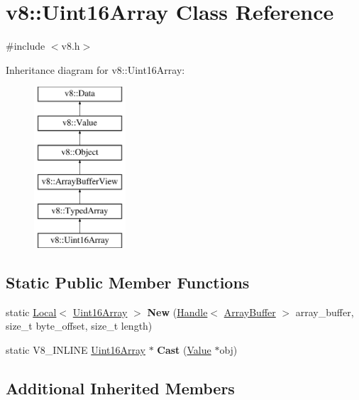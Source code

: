 \hypertarget{classv8_1_1Uint16Array}{}\section{v8\+:\+:Uint16\+Array Class Reference}
\label{classv8_1_1Uint16Array}


{\ttfamily \#include $<$v8.\+h$>$}

Inheritance diagram for v8\+:\+:Uint16\+Array\+:\begin{figure}[H]
\begin{center}
\leavevmode
\includegraphics[height=6.000000cm]{classv8_1_1Uint16Array}
\end{center}
\end{figure}
\subsection*{Static Public Member Functions}
\begin{DoxyCompactItemize}
\item 
\hypertarget{classv8_1_1Uint16Array_a61009e1e8ee6903da33cb95685910270}{}static \hyperlink{classv8_1_1Local}{Local}$<$ \hyperlink{classv8_1_1Uint16Array}{Uint16\+Array} $>$ {\bfseries New} (\hyperlink{classv8_1_1Handle}{Handle}$<$ \hyperlink{classv8_1_1ArrayBuffer}{Array\+Buffer} $>$ array\+\_\+buffer, size\+\_\+t byte\+\_\+offset, size\+\_\+t length)\label{classv8_1_1Uint16Array_a61009e1e8ee6903da33cb95685910270}

\item 
\hypertarget{classv8_1_1Uint16Array_a84b017960621903a00ef2d912233ce34}{}static V8\+\_\+\+I\+N\+L\+I\+N\+E \hyperlink{classv8_1_1Uint16Array}{Uint16\+Array} $\ast$ {\bfseries Cast} (\hyperlink{classv8_1_1Value}{Value} $\ast$obj)\label{classv8_1_1Uint16Array_a84b017960621903a00ef2d912233ce34}

\end{DoxyCompactItemize}
\subsection*{Additional Inherited Members}


